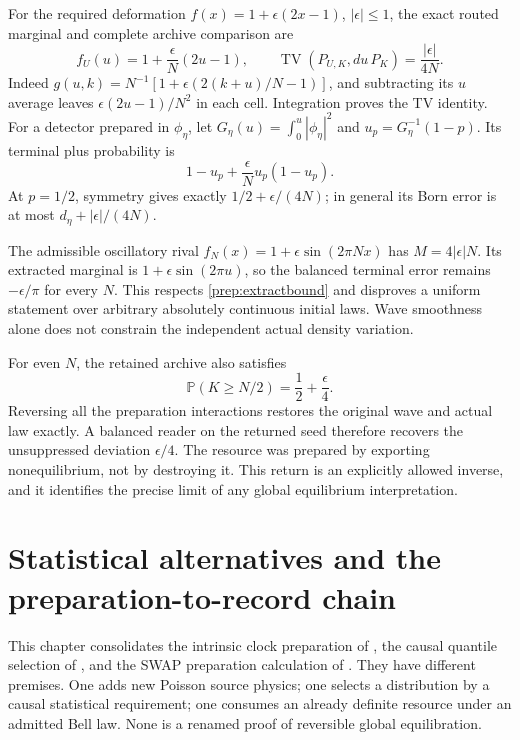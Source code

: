 \documentclass[11pt,oneside,openany]{book}
\theoremstyle{definition}
\theoremstyle{remark}\newtheorem{remark}[theorem]{Remark}
\begin{document}
For the required deformation $f(x)=1+\epsilon(2x-1)$,
$|\epsilon|\le1$, the exact routed marginal and complete archive comparison
are
\begin{equation}
 f_U(u)=1+\frac{\epsilon}{N}(2u-1),\qquad
 \operatorname{TV}(P_{U,K},du\,P_K)=\frac{|\epsilon|}{4N}.
 \label{prep:linear}
\end{equation}
Indeed $g(u,k)=N^{-1}[1+\epsilon(2(k+u)/N-1)]$,
and subtracting its $u$ average leaves
$\epsilon(2u-1)/N^2$ in each cell. Integration proves the TV identity.
For a detector prepared in $\phi_\eta$, let
$G_\eta(u)=\int_0^u|\phi_\eta|^2$ and
$u_p=G_\eta^{-1}(1-p)$. Its terminal plus probability is
\[
 1-u_p+\frac{\epsilon}{N}u_p(1-u_p).
\]
At $p=1/2$, symmetry gives exactly $1/2+\epsilon/(4N)$;
in general its Born error is at most $d_\eta+|\epsilon|/(4N)$.

The admissible oscillatory rival
$f_N(x)=1+\epsilon\sin(2\pi Nx)$ has
$M=4|\epsilon|N$. Its extracted marginal is
$1+\epsilon\sin(2\pi u)$, so the balanced terminal error remains
$-\epsilon/\pi$ for every $N$. This respects \eqref{prep:extractbound}
and disproves a uniform statement over arbitrary absolutely continuous
initial laws. Wave smoothness alone does not constrain the independent
actual density variation.

For even $N$, the retained archive also satisfies
\[
 \mathbb P(K\ge N/2)=\frac12+\frac{\epsilon}{4}.
\]
Reversing all the preparation interactions restores the original wave and
actual law exactly. A balanced reader on the returned seed therefore
recovers the unsuppressed deviation $\epsilon/4$.
The resource was prepared by exporting nonequilibrium, not by destroying
it. This return is an explicitly allowed inverse, and it identifies the
precise limit of any global equilibrium interpretation.

\chapter{Statistical alternatives and the preparation-to-record chain}
\label{prep:alternatives}

This chapter consolidates the intrinsic clock preparation of \cite{M19},
the causal quantile selection of \cite{M20}, and the SWAP preparation
calculation of \cite{C01,C02}. They have different premises. One adds
new Poisson source physics; one selects a distribution by a causal
statistical requirement; one consumes an already definite resource under
an admitted Bell law. None is a renamed proof of reversible global
equilibration.
\end{document}
